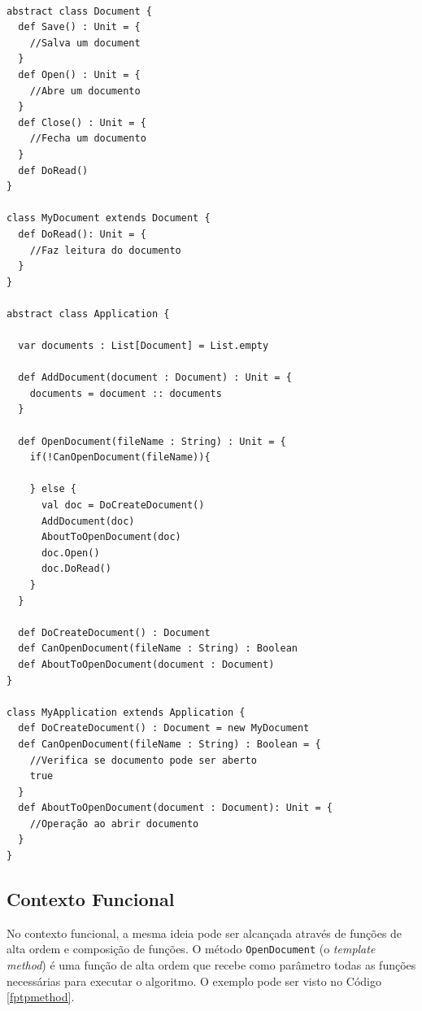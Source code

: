 \begin{lstlisting}[caption={\textit{Template Method} Orientado a Objetos.},label=ootpmethod]

abstract class Document {
  def Save() : Unit = {
    //Salva um document
  }
  def Open() : Unit = {
    //Abre um documento
  }
  def Close() : Unit = {
    //Fecha um documento
  }
  def DoRead()
}

class MyDocument extends Document {
  def DoRead(): Unit = {
    //Faz leitura do documento
  }
}

abstract class Application {

  var documents : List[Document] = List.empty

  def AddDocument(document : Document) : Unit = {
    documents = document :: documents
  }

  def OpenDocument(fileName : String) : Unit = {
    if(!CanOpenDocument(fileName)){

    } else {
      val doc = DoCreateDocument()
      AddDocument(doc)
      AboutToOpenDocument(doc)
      doc.Open()
      doc.DoRead()
    }
  }

  def DoCreateDocument() : Document
  def CanOpenDocument(fileName : String) : Boolean
  def AboutToOpenDocument(document : Document)
}

class MyApplication extends Application {
  def DoCreateDocument() : Document = new MyDocument
  def CanOpenDocument(fileName : String) : Boolean = {
    //Verifica se documento pode ser aberto
    true
  }
  def AboutToOpenDocument(document : Document): Unit = {
    //Operação ao abrir documento
  }
}

\end{lstlisting}

\subsection*{Contexto Funcional}

No contexto funcional, a mesma ideia pode ser alcançada 
através de funções de alta ordem e composição de funções. 
O método \texttt{OpenDocument} (o \textit{template method}) é 
uma função de alta ordem que recebe como parâmetro todas 
as funções necessárias para executar o algoritmo. 
O exemplo pode ser visto no Código \ref{fptpmethod}.

